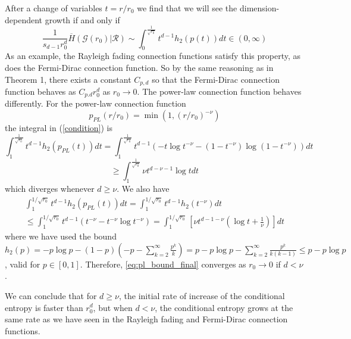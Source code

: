 \documentclass{article}
\newcommand{\graph}{\mathcal{G}}
\begin{document}
    After a change of variables $t = r/r_0$ we find that we will see the dimension-dependent growth if and only if
    \begin{equation}
        \label{condition}
        \frac{1}{s_{d-1}r_0^d}\overline{H}(\graph(r_0)|\mathcal{R}) \sim \int_0^{\frac{1}{\sqrt{r_0}}} t^{d-1}h_2(p(t)) dt \in (0,\infty)
    \end{equation}
    As an example, the Rayleigh fading connection functions satisfy this property, as does the Fermi-Dirac connection function. So by the same reasoning as in Theorem 1, there exists a constant $C_{p,d}$ so that the Fermi-Dirac connection function behaves as $C_{p.d}r_0^d$ as $r_0\to0$. The power-law connection function behaves differently. For the power-law connection function
    \begin{equation}
        p_{PL}(r/r_0) = \min(1,(r/r_0)^{-\nu})
    \end{equation}
    the integral in (\ref{condition}) is
    \begin{equation}
        \int_1^{\frac{1}{\sqrt{r_0}}} t^{d-1}h_2(p_{PL}(t))dt = \int_1^{\frac{1}{\sqrt{r_0}}} t^{d-1}(-t\log t^{-\nu} - (1-t^{-\nu})\log(1-t^{-\nu}))dt
    \end{equation}
    \begin{equation}
        \geq \int_1^{\frac{1}{\sqrt{r_0}}} \nu t^{d-\nu-1}\log tdt
    \end{equation}
    which diverges whenever $d \geq \nu$. We also have
    \begin{gather}
        \label{eq:pl_bound_final}
        \int_1^{1/\sqrt{r_0}} t^{d-1}h_2(p_{PL}(t))dt = \int_1^{1/\sqrt{r_0}} t^{d-1}h_2(t^{-\nu})dt \nonumber \\ \leq \int_1^{1/\sqrt{r_0}} t^{d-1}(t^{-\nu} - t^{-\nu}\log t^{-\nu})= \int_1^{1/\sqrt{r_0}} \left[\nu t^{d-1-\nu}\left(\log t+\frac{1}{\nu}\right)\right]dt
    \end{gather}
    where we have used the bound $h_2(p)=-p\log p-(1-p)(-p-\sum_{k=2}^\infty\frac{p^k}{k})=p-p\log p-\sum_{k=2}^\infty \frac{p^k}{k(k-1)}\leq p-p\log p$, valid for $p \in [0,1]$. Therefore, \eqref{eq:pl_bound_final} converges as $r_0 \to 0$ if $d<\nu$.
    
    We can conclude that for $d \geq \nu$, the initial rate of increase of the conditional entropy is faster than $r_0^d$, but when $d < \nu$, the conditional entropy grows at the same rate as we have seen in the Rayleigh fading and Fermi-Dirac connection functions.
    
\end{document}
